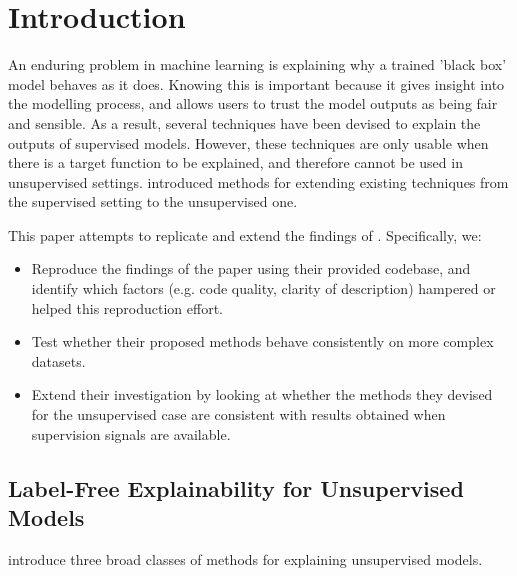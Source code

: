 \section{Introduction}
\label{sec:introduction}

An enduring problem in machine learning is explaining why a trained 'black box' model behaves as it does. Knowing this is important because it gives insight into the modelling process, and allows users to trust the model outputs as being fair and sensible. As a result, several techniques have been devised to explain the outputs of supervised models. However, these techniques are only usable when there is a target function to be explained, and therefore cannot be used in unsupervised settings. \citet{crabbe2022label} introduced methods for extending existing techniques from the supervised setting to the unsupervised one.  

\vspace{1em}

This paper attempts to replicate and extend the findings of \citet{crabbe2022label}. Specifically, we:
\begin{itemize}
    \item Reproduce the findings of the paper using their provided codebase, and identify which factors (e.g. code quality, clarity of description) hampered or helped this reproduction effort.
    \item Test whether their proposed methods behave consistently on more complex datasets.
    \item Extend their investigation by looking at whether the methods they devised for the unsupervised case are consistent with results obtained when supervision signals are available. 
\end{itemize}


\subsection{Label-Free Explainability for Unsupervised Models}
\citet{crabbe2022label} introduce three broad classes of methods for explaining unsupervised models.

